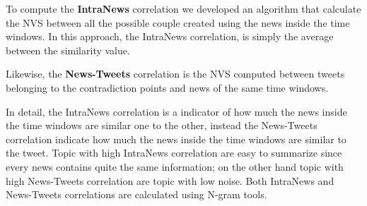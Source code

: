 To compute the \textbf{IntraNews} correlation we developed an algorithm that calculate the NVS between all the possible couple created
using the news inside the time windows. In this approach, the IntraNews correlation, is simply the average between the similarity value.

Likewise, the \textbf{News-Tweets} correlation is the NVS computed between tweets belonging to the contradiction points and 
news of the same time windows.

In detail, the IntraNews correlation is a indicator of how much the news inside the time windows are similar one to the other,
instead the News-Tweets correlation indicate how much the news inside the time windows are similar to the tweet.
Topic with high IntraNews correlation are easy to summarize since every news contains quite the same information;
on the other hand topic with high News-Tweets correlation are topic with low noise.
Both IntraNews and News-Tweets  correlations are calculated using N-gram tools.

